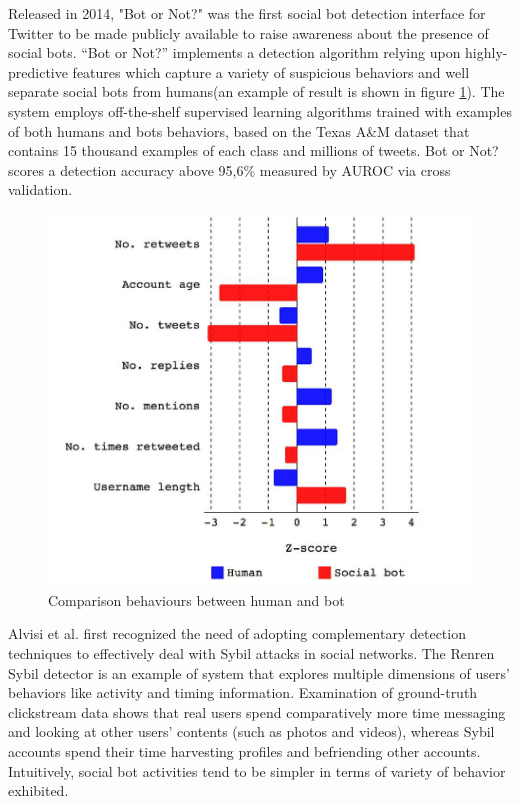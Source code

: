 \documentclass[conference, onecolumn]{IEEEtran}
\begin{document}
Released in 2014, "Bot or Not?" was the first social bot detection interface for Twitter to be made publicly available to raise awareness about the presence of social bots. “Bot or Not?” implements a detection algorithm relying upon highly-predictive features which capture a variety of suspicious behaviors and well separate social bots from humans(an example of result is shown in figure \ref{fig:tweetbot}). The system employs off-the-shelf supervised learning algorithms trained with examples of both humans and bots behaviors, based on the Texas A\&M dataset that contains 15 thousand examples of each class and millions of tweets. Bot or Not? scores a detection accuracy above 95,6\% measured by AUROC via cross validation.
\begin{figure} [!htbp]
	\centering
	\vspace{0.3cm}
	\includegraphics[scale=0.7]{images/tweetbot}
	\caption{Comparison behaviours between human and bot}
	\vspace{0.3cm}
	\label{fig:tweetbot}
\end{figure}
\medskip

Alvisi et al. first recognized the need of adopting complementary detection techniques to effectively deal with Sybil attacks in social networks. The Renren Sybil detector is an example of system that explores multiple dimensions of users' behaviors like activity and timing information. Examination of ground-truth clickstream data shows that real users spend comparatively more time messaging and looking at other users' contents (such as photos and videos), whereas Sybil accounts spend their time harvesting profiles and befriending other accounts. Intuitively, social bot activities tend to be simpler in terms of variety of behavior exhibited.
\medskip
\end{document}
